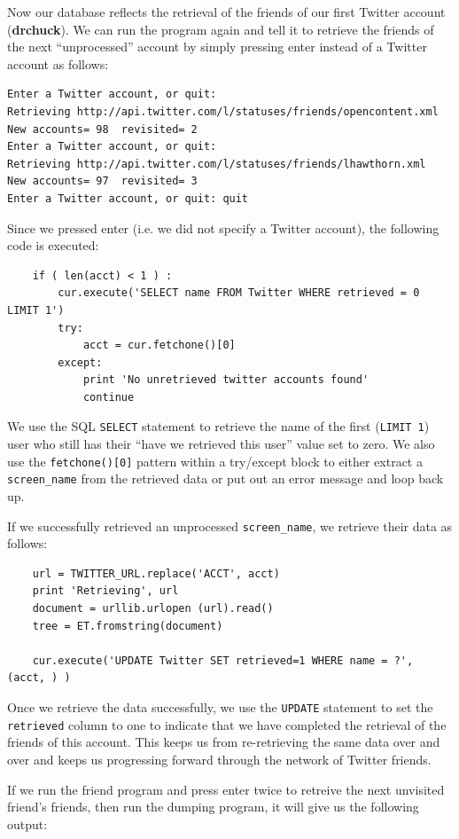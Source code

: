 \documentclass[10pt]{book}
\begin{document}
Now our database reflects the retrieval of the friends of 
our first Twitter account ({\bf drchuck}).  We can run the program
again and tell it to retrieve the friends of the next 
``unprocessed'' account by simply pressing enter instead of
a Twitter account as follows:
\beforeverb
\begin{verbatim}
Enter a Twitter account, or quit: 
Retrieving http://api.twitter.com/l/statuses/friends/opencontent.xml
New accounts= 98  revisited= 2
Enter a Twitter account, or quit: 
Retrieving http://api.twitter.com/l/statuses/friends/lhawthorn.xml
New accounts= 97  revisited= 3
Enter a Twitter account, or quit: quit
\end{verbatim}
\afterverb
%
Since we pressed enter (i.e. we did not specify a Twitter account),
the following code is executed:
\beforeverb
\begin{verbatim}
    if ( len(acct) < 1 ) :
        cur.execute('SELECT name FROM Twitter WHERE retrieved = 0 LIMIT 1')
        try:
            acct = cur.fetchone()[0]
        except:
            print 'No unretrieved twitter accounts found'
            continue
\end{verbatim}
\afterverb
%
We use the SQL {\tt SELECT} statement to retrieve the name of the first 
({\tt LIMIT 1}) user who still has their ``have we retrieved this user''
value set to zero.  We also use the {\tt fetchone()[0]} pattern within 
a try/except block to either extract a \verb"screen_name" from the retrieved
data or put out an error message and loop back up.

If we successfully retrieved an unprocessed \verb"screen_name", we retrieve
their data as follows:

\beforeverb
\begin{verbatim}
    url = TWITTER_URL.replace('ACCT', acct)
    print 'Retrieving', url
    document = urllib.urlopen (url).read()
    tree = ET.fromstring(document)

    cur.execute('UPDATE Twitter SET retrieved=1 WHERE name = ?', (acct, ) )
\end{verbatim}
\afterverb
%
Once we retrieve the data successfully, we use the {\tt UPDATE} statement 
to set the {\tt retrieved} column to one to indicate that we have completed 
the retrieval of the friends of this account.  This keeps us from re-retrieving
the same data over and over and keeps us progressing forward through the network
of Twitter friends.

If we run the friend program and press enter twice to retreive the next 
unvisited friend's friends,
then run the dumping program, it will give us the following output:
\end{document}
